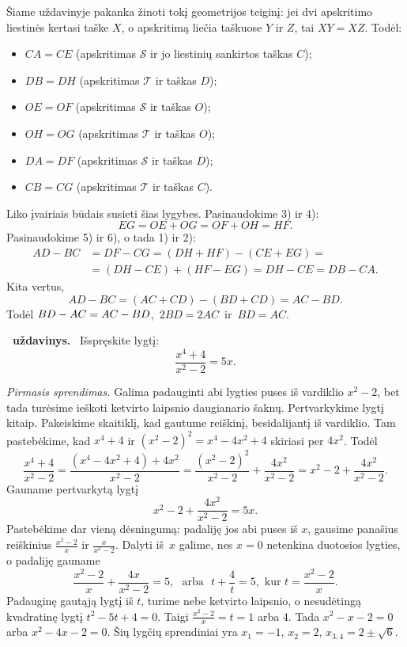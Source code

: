 \documentclass[11pt,a4paper]{article}
\newcommand{\hm}[1]{\nobreak\hspace{0pt}#1\nobreak\hspace{0pt}}
\newcounter{uzdavinys}
\newenvironment{uzdavinys}
  {\refstepcounter{uzdavinys}\par\medskip\noindent\textbf{\theuzdavinys\ uždavinys.}\ }
  {\par\medskip}
\begin{document}
Šiame uždavinyje pakanka žinoti tokį geometrijos teiginį: jei dvi apskritimo liestinės kertasi taške $X$, o apskritimą liečia taškuose $Y$ ir $Z$, tai $XY=XZ$. Todėl:
\begin{itemize}
\item[1)] $CA=CE$ (apskritimas $\mathcal S$ ir jo liestinių sankirtos taškas $C$);
\item[2)] $DB=DH$ (apskritimas $\mathcal T$ ir taškas $D$);
\item[3)] $OE=OF$ (apskritimas $\mathcal S$ ir taškas $O$);
\item[4)] $OH=OG$ (apskritimas $\mathcal T$ ir taškas $O$);
\item[5)] $DA=DF$ (apskritimas $\mathcal S$ ir taškas $D$);
\item[6)] $CB=CG$ (apskritimas $\mathcal T$ ir taškas $C$).
\end{itemize}
Liko įvairiais būdais susieti šias lygybes. Pasinaudokime 3) ir 4): $$EG=OE+OG=OF+OH=HF.$$ Pasinaudokime 5) ir 6), o tada 1) ir 2):
 \begin{align*}AD-BC&=DF-CG=(DH+HF)-(CE+EG)=\\&=(DH-CE)+(HF-EG)=DH-CE=DB-CA.\end{align*}
Kita vertus, $$AD-BC=(AC+CD)-(BD+CD)=AC-BD.$$ Todėl $BD-AC\hm{=}AC-BD$, \,$2BD=2AC$\, ir \,$BD=AC$.

 \vspace{0,3cm}  

\begin{uzdavinys}
Išspręskite lygtį:
$$\frac{x^4+4}{x^2-2}=5x.$$
\end{uzdavinys}

\textit{Pirmasis sprendimas.} Galima padauginti abi lygties puses iš vardiklio $x^2-2$, bet tada turėsime ieškoti ketvirto laipsnio daugianario šaknų. Pertvarkykime lygtį kitaip. Pakeiskime skaitiklį, kad gautume reiškinį, besidalijantį iš vardiklio. Tam pastebėkime, kad $x^4+4$ ir $(x^2-2)^2=x^4-4x^2+4$ skiriasi per $4x^2$. Todėl
$$\frac{x^4+4}{x^2-2}=\frac{(x^4-4x^2+4)+4x^2}{x^2-2}=\frac{(x^2-2)^2}{x^2-2}+\frac{4x^2}{x^2-2}=x^2-2+\frac{4x^2}{x^2-2}.$$
Gauname pertvarkytą lygtį $$x^2-2+\frac{4x^2}{x^2-2}=5x.$$ Pastebėkime dar vieną dėsningumą: padaliję jos abi puses iš $x$, gausime panašius reiškinius $\frac{x^2-2}x$ ir $\frac x{x^2-2}$. Dalyti iš~$x$ galime, nes $x=0$ netenkina duotosios lygties, o padaliję gauname
$$\frac{x^2-2}{x}+\frac{4x}{x^2-2}=5,\text{~ arba ~}t+\frac{4}{t}=5,\text{ kur }t=\frac{x^2-2}{x}.$$
Padauginę gautąją lygtį iš $t$, turime nebe ketvirto laipsnio, o nesudėtingą kvadratinę lygtį $t^2-5t+4=0.$
Taigi $\frac{x^2-2}{x}=t=1$ arba 4. Tada $x^2-x-2=0$ arba $x^2-4x-2=0$. Šių lygčių sprendiniai yra $x_1=-1$, $x_2=2$, $x_{3,4}=2\pm\sqrt{6}$.
\end{document}

